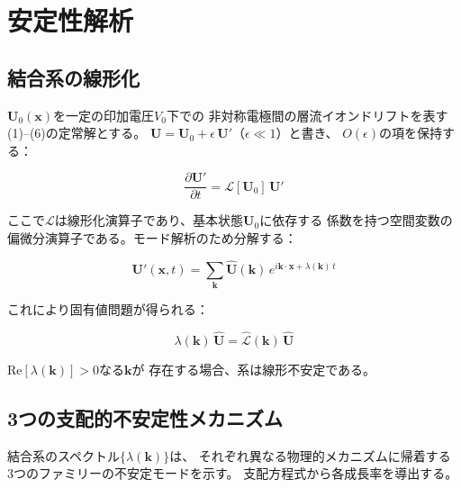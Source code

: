 \documentclass[12pt,twocolumn]{ltjsarticle}
\newcommand{\uu}{\mathbf{U}}
\newcommand{\Lop}{\mathcal{L}}
\begin{document}
\section{安定性解析}
\label{sec:stability}

\subsection{結合系の線形化}
\label{sec:stability:linearization}

$\uu_0(\mathbf{x})$を一定の印加電圧$V_0$下での
非対称電極間の層流イオンドリフトを表す
(1)--(6)の定常解とする。
$\uu = \uu_0 + \epsilon\,\uu'$（$\epsilon \ll 1$）と書き、
$O(\epsilon)$の項を保持する：

\begin{equation}
  \frac{\partial \uu'}{\partial t} = \Lop[\uu_0]\,\uu'
  \label{eq:linearized_full}
\end{equation}

ここで$\Lop$は線形化演算子であり、基本状態$\uu_0$に依存する
係数を持つ空間変数の偏微分演算子である。モード解析のため分解する：

\begin{equation}
  \uu'(\mathbf{x}, t)
  = \sum_{\mathbf{k}} \hat{\uu}(\mathbf{k})\,
    e^{i\mathbf{k}\cdot\mathbf{x} + \lambda(\mathbf{k})\,t}
  \label{eq:modal_decomposition}
\end{equation}

これにより固有値問題が得られる：

\begin{equation}
  \lambda(\mathbf{k})\,\hat{\uu}
  = \hat{\Lop}(\mathbf{k})\,\hat{\uu}
  \label{eq:dispersion_EVP}
\end{equation}

$\mathrm{Re}[\lambda(\mathbf{k})] > 0$なる$\mathbf{k}$が
存在する場合、系は線形不安定である。

\subsection{3つの支配的不安定性メカニズム}
\label{sec:stability:instabilities}

結合系のスペクトル$\{\lambda(\mathbf{k})\}$は、
それぞれ異なる物理的メカニズムに帰着する
3つのファミリーの不安定モードを示す。
支配方程式から各成長率を導出する。
\end{document}
